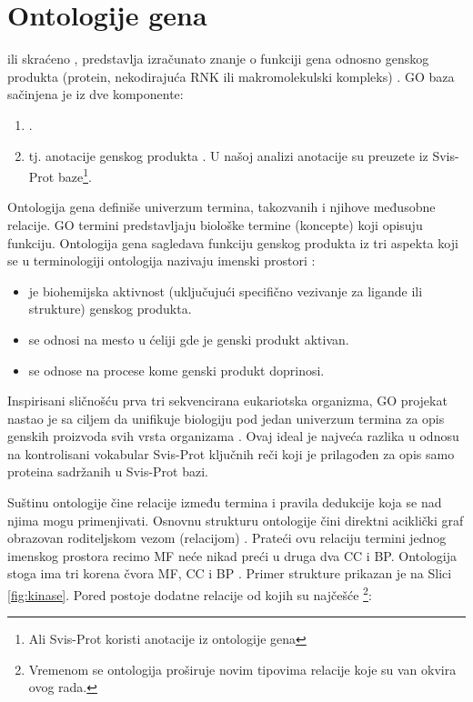 \section{Ontologije gena}


  ili skraćeno , 
predstavlja izračunato znanje o funkciji gena odnosno genskog
produkta (protein, nekodirajuća RNK ili makromolekulski kompleks)
\parencite{GO2016}.
GO baza sačinjena je iz dve komponente:
\begin{enumerate}
  \item {}.
  \item {} tj. anotacije genskog produkta . U našoj
    analizi anotacije su preuzete iz Svis-Prot baze\footnote{Ali Svis-Prot koristi anotacije iz ontologije gena}.
\end{enumerate}

Ontologija gena definiše univerzum termina, takozvanih 
 i njihove međusobne relacije. GO termini predstavljaju biološke
termine (koncepte) koji opisuju funkciju. Ontologija gena sagledava funkciju
genskog produkta iz tri aspekta koji se u terminologiji ontologija nazivaju
imenski prostori :
\begin{itemize}
  \item {} je biohemijska aktivnost (uključujući
    specifično vezivanje za ligande ili strukture) genskog produkta.
  \item {} se odnosi na mesto u ćeliji gde je
    genski produkt aktivan.
  \item {} se odnose na procese kome genski produkt
    doprinosi.
\end{itemize}

Inspirisani sličnošću prva tri sekvencirana eukariotska organizma, GO projekat
nastao je sa ciljem da  unifikuje biologiju pod jedan univerzum termina za opis
genskih proizvoda svih vrsta organizama \parencite{GO2000}. Ovaj ideal je najveća
razlika u odnosu na kontrolisani vokabular Svis-Prot ključnih reči koji je
prilagođen za opis samo proteina sadržanih u Svis-Prot bazi.

Suštinu ontologije čine relacije između termina i pravila dedukcije koja se nad
njima mogu primenjivati. Osnovnu strukturu ontologije čini direktni aciklički
graf  obrazovan roditeljskom vezom (relacijom) . Prateći
ovu relaciju termini jednog imenskog prostora recimo MF neće nikad preći u
druga dva CC i BP.  Ontologija stoga ima tri korena čvora MF, CC i BP
\parencite{go_struktura}. Primer strukture prikazan je na
Slici \ref{fig:kinase}.  Pored  postoje dodatne relacije od kojih
su najčešće \footnote{Vremenom se ontologija proširuje novim tipovima relacije
koje su van okvira ovog rada.}:

